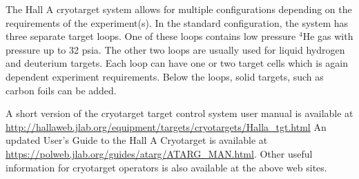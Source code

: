 

The Hall A cryotarget system allows for multiple configurations depending
on the requirements of the experiment(s). In the standard configuration,
the system has three separate target loops. One of these loops contains
low pressure $^{4}$He gas with pressure up to 32 psia. The other
two loops are usually used for liquid hydrogen and deuterium targets.
Each loop can have one or two target cells which is again dependent
experiment requirements.   Below the loops, solid targets, such as carbon foils
can be added.   

A short version of the cryotarget target control system user manual
is available at \url{http://hallaweb.jlab.org/equipment/targets/cryotargets/Halla\_tgt.html}
An updated User's Guide to the Hall A Cryotarget is available at \url{https://polweb.jlab.org/guides/atarg/ATARG\_MAN.html}.
Other useful information for cryotarget operators is also available
at the above web sites.

